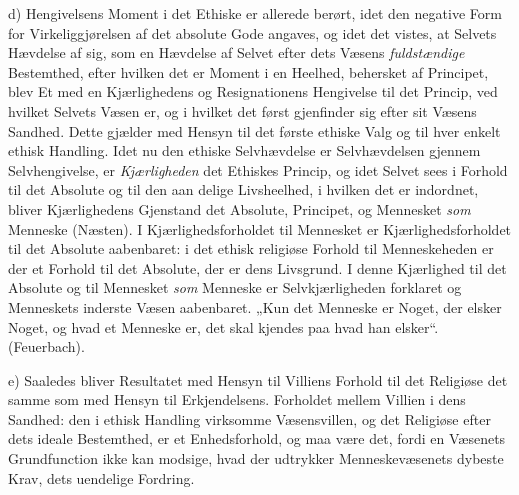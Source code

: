 d) Hengivelsens Moment i det Ethiske er allerede berørt, idet den negative Form
for Virkeliggjørelsen af det absolute Gode angaves, og idet det vistes, at Selvets
Hævdelse af sig, som en Hævdelse af Selvet efter dets Væsens
\emph{fuldstændige} Bestemthed, efter hvilken det er Moment i en Heelhed,
behersket af Principet, blev Et med en Kjærlighedens og Resignationens Hengivelse
til det Princip, ved hvilket Selvets Væsen er, og i hvilket det først gjenfinder
sig efter sit Væsens Sandhed. Dette gjælder med Hensyn til det første ethiske Valg
og til hver enkelt ethisk Handling. Idet nu den ethiske Selvhævdelse er
Selvhævdelsen gjennem Selvhengivelse, er \emph{Kjærligheden} det Ethiskes Princip,
og idet Selvet sees i Forhold til det Absolute og til den aan\-%
delige Livsheelhed, i hvilken det er indordnet, bliver Kjærlighedens Gjenstand det
Absolute, Principet, og Mennesket \emph{som} Menneske (Næsten). I
Kjærlighedsforholdet til Mennesket er Kjærlighedsforholdet til det Absolute
aabenbaret: i det ethisk religiøse Forhold til Menneskeheden er der et Forhold til
det Absolute, der er dens Livsgrund. I denne Kjærlighed til det Absolute og til
Mennesket \emph{som} Menneske er Selvkjærligheden forklaret og Menneskets inderste
Væsen aabenbaret. „Kun det Menneske er Noget, der elsker Noget, og hvad et
Menneske er, det skal kjendes paa hvad han elsker“. (Feuerbach).

e) Saaledes bliver Resultatet med Hensyn til Villiens Forhold til det Religiøse
det samme som med Hensyn til Erkjendelsens. Forholdet mellem Villien i dens
Sandhed: den i ethisk Handling virksomme Væsensvillen, og det Religiøse efter dets
ideale Bestemthed, er et Enhedsforhold, og maa være det, fordi en Væsenets
Grundfunction ikke kan modsige, hvad der udtrykker Menneskevæsenets dybeste Krav,
dets uendelige Fordring.

